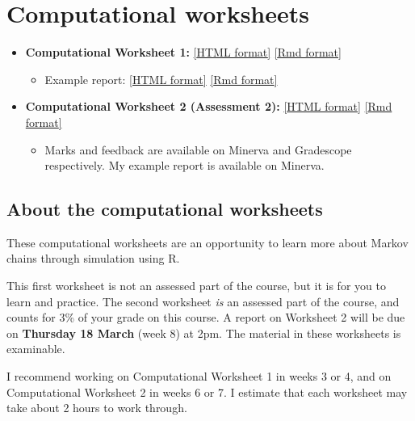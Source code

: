 \documentclass[
  a4paper,
]{article}
\providecommand{\tightlist}{%
  \setlength{\itemsep}{0pt}\setlength{\parskip}{0pt}}
\theoremstyle{definition}
\theoremstyle{definition}
\theoremstyle{definition}
\theoremstyle{remark}
\begin{document}
\hypertarget{computing}{%
\section*{Computational worksheets}\label{computing}}

\begin{itemize}
\tightlist
\item
  \textbf{Computational Worksheet 1:} \href{computing/C1.html}{{[}HTML format{]}} \href{computing/C1.Rmd}{{[}Rmd format{]}}

  \begin{itemize}
  \tightlist
  \item
    Example report: \href{computing/C1-example.html}{{[}HTML format{]}} \href{computing/C1-example.Rmd}{{[}Rmd format{]}}
  \end{itemize}
\item
  \textbf{Computational Worksheet 2 (Assessment 2):} \href{computing/C2.html}{{[}HTML format{]}} \href{computing/C2.Rmd}{{[}Rmd format{]}}

  \begin{itemize}
  \tightlist
  \item
    Marks and feedback are available on Minerva and Gradescope respectively. My example report is available on Minerva.
  \end{itemize}
\end{itemize}

\hypertarget{C-about}{%
\subsection*{About the computational worksheets}\label{C-about}}

These computational worksheets are an opportunity to learn more about Markov chains through simulation using R.

This first worksheet is not an assessed part of the course, but it is for you to learn and practice. The second worksheet \emph{is} an assessed part of the course, and counts for 3\% of your grade on this course. A report on Worksheet 2 will be due on \textbf{Thursday 18 March} (week 8) at 2pm. The material in these worksheets is examinable.

I recommend working on Computational Worksheet 1 in weeks 3 or 4, and on Computational Worksheet 2 in weeks 6 or 7. I estimate that each worksheet may take about 2 hours to work through.
\end{document}
